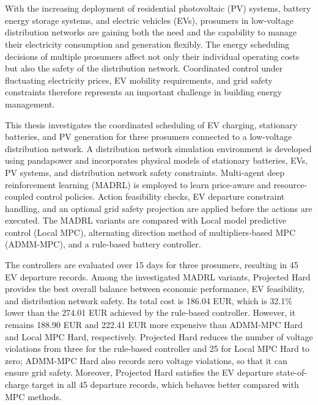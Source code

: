 ﻿\chapter{\abstractname}

With the increasing deployment of residential photovoltaic (PV) systems, battery energy storage systems, and electric vehicles (EVs), prosumers in low-voltage distribution networks are gaining both the need and the capability to manage their electricity consumption and generation flexibly. The energy scheduling decisions of multiple prosumers affect not only their individual operating costs but also the safety of the distribution network. Coordinated control under fluctuating electricity prices, EV mobility requirements, and grid safety constraints therefore represents an important challenge in building energy management.


This thesis investigates the coordinated scheduling of EV charging, stationary batteries, and PV generation for three prosumers connected to a low-voltage distribution network. A distribution network simulation environment is developed using pandapower and incorporates physical models of stationary batteries, EVs, PV systems, and distribution network safety constraints. Multi-agent deep reinforcement learning (MADRL) is employed to learn price-aware and resource-coupled control policies. Action feasibility checks, EV departure constraint handling, and an optional grid safety projection are applied before the actions are executed. The MADRL variants are compared with Local model predictive control (Local MPC), alternating direction method of multipliers-based MPC (ADMM-MPC), and a rule-based battery controller.


The controllers are evaluated over 15 days for three prosumers, resulting in 45 EV departure records. Among the investigated MADRL variants, Projected Hard provides the best overall balance between economic performance, EV feasibility, and distribution network safety. Its total cost is 186.04 EUR, which is 32.1\% lower than the 274.01 EUR achieved by the rule-based controller. However, it remains 188.90 EUR and 222.41 EUR more expensive than ADMM-MPC Hard and Local MPC Hard, respectively. Projected Hard reduces the number of voltage violations from three for the rule-based controller and 25 for Local MPC Hard to zero; ADMM-MPC Hard also records zero voltage violations, so that it can ensure grid safety. Moreover, Projected Hard satisfies the EV departure state-of-charge target in all 45 departure records, which behaves better compared with MPC methods.

